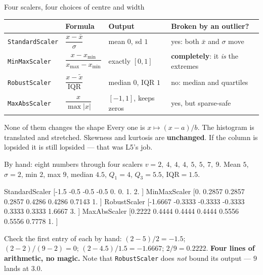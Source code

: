 \documentclass[aspectratio=169]{beamer}
\begin{document}
\begin{frame}[shrink=6]{Four scalers, four choices of centre and width}
  \begin{center}\small
  \begin{tabular}{@{}llll@{}}
    \toprule
    & \textbf{Formula} & \textbf{Output} & \textbf{Broken by an outlier?}\\
    \midrule
    \texttt{StandardScaler} & $\dfrac{x-\bar x}{\sigma}$ &
      mean $0$, sd $1$ & yes: both $\bar x$ and $\sigma$ move\\[7pt]
    \texttt{MinMaxScaler} & $\dfrac{x-x_{\min}}{x_{\max}-x_{\min}}$ &
      exactly $[0,1]$ & \textbf{completely}: it \emph{is} the extremes\\[7pt]
    \texttt{RobustScaler} & $\dfrac{x-\tilde x}{\mathrm{IQR}}$ &
      median $0$, IQR $1$ & no: median and quartiles\\[7pt]
    \texttt{MaxAbsScaler} & $\dfrac{x}{\max|x|}$ &
      $[-1,1]$, keeps zeros & yes, but sparse-safe\\
    \bottomrule
  \end{tabular}
  \end{center}
  \vspace{0.3em}
  \begin{block}{None of them changes the shape}
    \small Every one is $x \mapsto (x - a)/b$. The histogram is translated and
    stretched. Skewness and kurtosis are \textbf{unchanged}. If the column is
    lopsided it is still lopsided --- that was L5's job.
  \end{block}
\end{frame}

\begin{frame}[fragile,shrink=6]{By hand: eight numbers through four scalers}
$v = 2,\ 4,\ 4,\ 4,\ 5,\ 5,\ 7,\ 9$. Mean $5$, $\sigma = 2$, min $2$, max $9$,
median $4.5$, $Q_1 = 4$, $Q_3 = 5.5$, $\mathrm{IQR} = 1.5$.
\begin{outblk}
StandardScaler [-1.5 -0.5 -0.5 -0.5  0.   0.   1.   2. ]
MinMaxScaler   [0.     0.2857 0.2857 0.2857 0.4286 0.4286 0.7143 1.    ]
RobustScaler   [-1.6667 -0.3333 -0.3333 -0.3333  0.3333  0.3333  1.6667  3.    ]
MaxAbsScaler   [0.2222 0.4444 0.4444 0.4444 0.5556 0.5556 0.7778 1.    ]
\end{outblk}
\begin{center}\small
  Check the first entry of each by hand: $(2-5)/2 = -1.5$;
  $(2-2)/(9-2) = 0$; $(2-4.5)/1.5 = -1.6667$; $2/9 = 0.2222$.
  \textbf{Four lines of arithmetic, no magic.} Note that
  \texttt{RobustScaler} does \emph{not} bound its output --- $9$ lands at
  $3.0$.
\end{center}
\end{frame}
\end{document}
